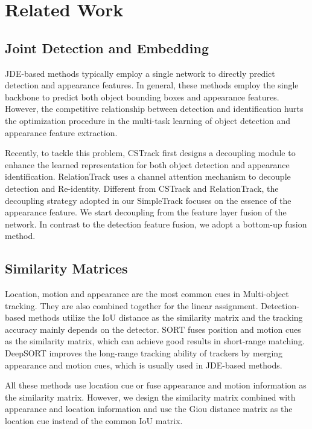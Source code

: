\documentclass[runningheads]{llncs}
\begin{document}
\section{Related Work}
\subsection{Joint Detection and Embedding}
JDE-based methods typically employ a single network to directly predict detection and appearance features\cite{liang2020rethinking,liang2021one,lu2020retinatrack,pang2021quasi,wang2020towards,zhang2021voxeltrack,zhang2021fairmot}. In general, these methods employ the single backbone to predict both object bounding boxes and appearance features. However, the competitive relationship between detection and identification hurts the optimization procedure in the multi-task learning of object detection and appearance feature extraction.

Recently, to tackle this problem, CSTrack\cite{liang2020rethinking} first designs a decoupling module to enhance the learned representation for both object detection and appearance identification. RelationTrack\cite{yu2022relationtrack} uses a channel attention mechanism to decouple detection and Re-identity. Different from CSTrack and RelationTrack, the decoupling strategy adopted in our SimpleTrack focuses on the essence of the appearance feature. We start decoupling from the feature layer fusion of the network. In contrast to the detection feature fusion, we adopt a bottom-up fusion method.
\subsection{Similarity Matrices}
Location, motion and appearance are the most common cues in Multi-object tracking. They are also combined together for the linear assignment. Detection-based methods\cite{zhang2021bytetrack} utilize the IoU distance as the similarity matrix and the tracking accuracy mainly depends on the detector. SORT\cite{bewley2016simple} fuses position and motion cues as the similarity matrix, which can achieve good results in short-range matching. DeepSORT\cite{wojke2017simple} improves the long-range tracking ability of trackers by merging appearance and motion cues, which is usually used in JDE-based methods. 

All these methods use location cue or fuse appearance and motion information as the similarity matrix. However, we design the similarity matrix combined with appearance and location information and use the Giou distance matrix as the location cue instead of the common IoU matrix.
\end{document}
